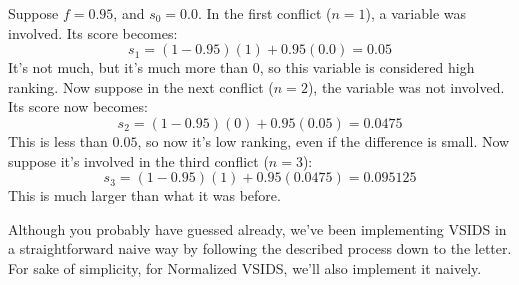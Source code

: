 \documentclass[oneside]{book}
\begin{document}
\begin{center}
    Suppose $f = 0.95$, and $s_0 = 0.0$. In the first conflict ($n = 1$),
    a variable was involved. Its score becomes:
    $$s_1 = (1 - 0.95)(1) + 0.95(0.0) = 0.05$$
    It's not much, but it's much more than 0, so this variable is considered 
    high ranking. Now suppose in the next conflict ($n = 2$), the variable was 
    not involved. Its score now becomes:
    $$s_2 = (1 - 0.95)(0) + 0.95(0.05) = 0.0475$$
    This is less than $0.05$, so now it's low ranking, even if the difference is small.
    Now suppose it's involved in the third conflict ($n = 3$):
    $$s_3 = (1 - 0.95)(1) + 0.95(0.0475) = 0.095125$$
    This is much larger than what it was before.
\end{center}

Although you probably have guessed already, we've been implementing VSIDS 
in a straightforward naive way by following the described process down to the letter. 
For sake of simplicity, for Normalized VSIDS, we'll also implement it naively.
\end{document}
